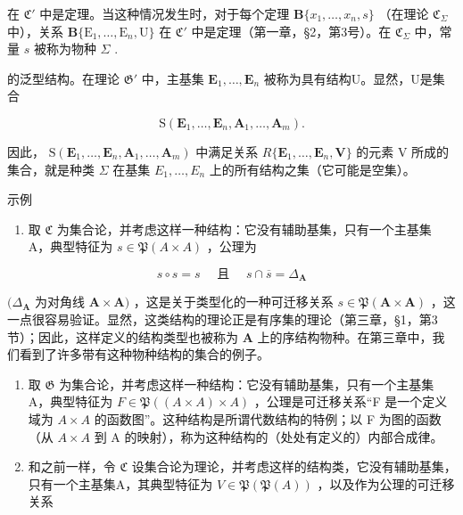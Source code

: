 在 \(\mathfrak{C}'\) 中是定理。当这种情况发生时，对于每个定理 \(\mathbf{B}\{x_1, \ldots, x_n, s\}\) （在理论 \(\mathfrak{C}_{\Sigma}\) 中），关系 \(\mathbf{B}\{\mathrm{E}_1, \ldots, \mathrm{E}_n, \mathrm{U}\}\) 在 \(\mathfrak{C}'\) 中是定理（第一章，§2，第3号）。在 \(\mathfrak{C}_{\Sigma}\) 中，常量 \(s\) 被称为物种 \(\Sigma\) .

的泛型结构。在理论 \(\mathfrak{G}'\) 中，主基集 \(\mathbf{E}_1, \ldots, \mathbf{E}_n\) 被称为具有结构U。显然，U是集合

\[
\mathrm{S} (\mathbf {E} _ {1}, \dots , \mathbf {E} _ {n}, \mathbf {A} _ {1}, \dots , \mathbf {A} _ {m}).
\]

因此， \(\mathrm{S}(\mathbf{E}_{1},\ldots,\mathbf{E}_{n},\mathbf{A}_{1},\ldots,\mathbf{A}_{m})\) 中满足关系 \(R\{\mathbf{E}_{1},\ldots,\mathbf{E}_{n},\mathbf{V}\}\) 的元素 V 所成的集合，就是种类 \(\Sigma\) 在基集 \(E_{1},\ldots,E_{n}\) 上的所有结构之集（它可能是空集）。

示例

\begin{enumerate}
\def\labelenumi{(\arabic{enumi})}
\tightlist
\item
  取 \(\mathfrak{C}\) 为集合论，并考虑这样一种结构：它没有辅助基集，只有一个主基集 A，典型特征为 \(s \in \mathfrak{P}(A \times A)\) ，公理为
\end{enumerate}

\[
s \circ s = s \quad \text { 且 } \quad s \cap \overline{s} = \Delta_{\mathbf{A}}
\]

\((\Delta_{\mathbf{A}}\) 为对角线 \(\mathbf{A} \times \mathbf{A})\) ，这是关于类型化的一种可迁移关系 \(s \in \mathfrak{P}(\mathbf{A} \times \mathbf{A})\) ，这一点很容易验证。显然，这类结构的理论正是有序集的理论（第三章，§1，第3节）；因此，这样定义的结构类型也被称为 \(\mathbf{A}\) 上的序结构物种。在第三章中，我们看到了许多带有这种物种结构的集合的例子。

\begin{enumerate}
\def\labelenumi{(\arabic{enumi})}
\setcounter{enumi}{1}
\item
  取 \(\mathfrak{G}\) 为集合论，并考虑这样一种结构：它没有辅助基集，只有一个主基集 A，典型特征为 \(F \in \mathfrak{P}((A \times A) \times A)\) ，公理是可迁移关系“F 是一个定义域为 \(A \times A\) 的函数图”。这种结构是所谓代数结构的特例；以 F 为图的函数（从 \(A \times A\) 到 A 的映射），称为这种结构的（处处有定义的）内部合成律。
\item
  和之前一样，令 \(\mathfrak{C}\) 设集合论为理论，并考虑这样的结构类，它没有辅助基集，只有一个主基集A，其典型特征为 \(V \in \mathfrak{P}(\mathfrak{P}(A))\) ，以及作为公理的可迁移关系
\end{enumerate}

